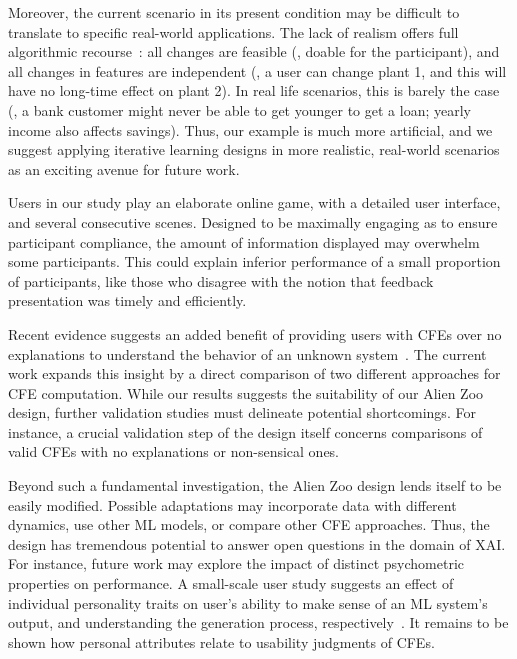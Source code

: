 Moreover, the current scenario in its present condition may be difficult to translate to specific real-world applications.
The lack of realism offers full algorithmic recourse~\citep{karimi_survey_2020}: all changes are feasible (\ie, doable for the participant), and all changes in features are independent (\ie, a user can change plant 1, and this will have no long-time effect on plant 2).
In real life scenarios, this is barely the case (\eg, a bank customer might never be able to get younger to get a loan; yearly income also affects savings). 
Thus, our example is much more artificial, and we suggest applying iterative learning designs in more realistic, real-world scenarios as an exciting avenue for future work.

Users in our study play an elaborate online game, with a detailed user interface, and several consecutive scenes.
Designed to be maximally engaging as to ensure participant compliance, the amount of information displayed may overwhelm some participants.
This could explain inferior performance of a small proportion of participants, like those who disagree with the notion that feedback presentation was timely and efficiently.

Recent evidence suggests an added benefit of providing users with \glspl{CFE} over no explanations to understand the behavior of an unknown system~\citep{van_der_waa_evaluating_2021}.
The current work expands this insight by a direct comparison of two different approaches for \gls{CFE} computation. 
While our results suggests the suitability of our Alien Zoo design, further validation studies must delineate potential shortcomings.
For instance, a crucial validation step of the design itself concerns comparisons of valid \glspl{CFE} with no explanations or non-sensical ones.

Beyond such a fundamental investigation, the Alien Zoo design lends itself to be easily modified.
Possible adaptations may incorporate data with different dynamics, use other \gls{ML} models, or compare other \gls{CFE} approaches.
Thus, the design has tremendous potential to answer open questions in the domain of \gls{XAI}.
For instance, future work may explore the impact of distinct psychometric properties on performance. 
A small-scale user study
suggests an effect of individual personality traits on user's ability to make sense of an \gls{ML} system's output, and understanding the generation process, respectively~\citep{gleaves_role_2020}.
It remains to be shown how personal attributes relate to usability judgments of \glspl{CFE}.

